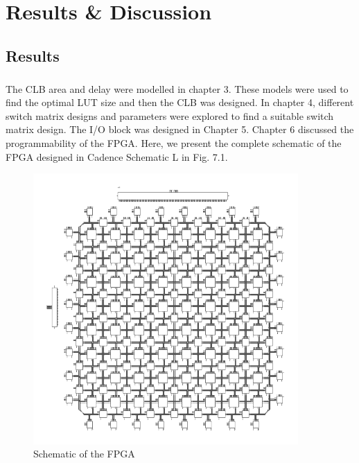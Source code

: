 %
%
\let\textcircled=\pgftextcircled
\chapter{Results \& Discussion}
\label{chap:results}

\section{Results}
\paragraph{}

The CLB area and delay were modelled in chapter 3. These models were used to find the optimal LUT size and then the CLB was designed. In chapter 4, different switch matrix designs and parameters were explored to find a suitable switch matrix design. The I/O block was designed in Chapter 5. Chapter 6 discussed the programmability of the FPGA. Here, we present the complete schematic of the FPGA designed in Cadence Schematic L in Fig. 7.1.

\begin{figure}[H]
\centering
\includegraphics[width=0.9\textwidth]{fpga.png}
\caption{Schematic of the FPGA}
\label{fig:Figure}
\end{figure}

